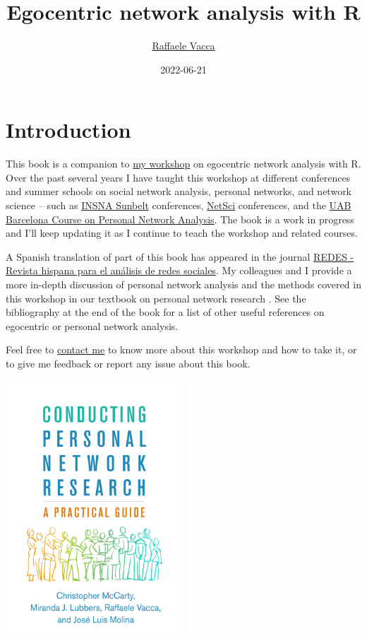 \documentclass[
]{book}
\title{Egocentric network analysis with R}
\author{\href{http://www.raffaelevacca.com/}{Raffaele Vacca}}
\date{2022-06-21}
\begin{document}
\maketitle

{
\setcounter{tocdepth}{1}
\tableofcontents
}
\hypertarget{introduction}{%
\chapter{Introduction}\label{introduction}}

This book is a companion to \href{http://www.raffaelevacca.com/teaching/egocentric-r/}{my workshop} on egocentric network analysis with R. Over the past several years I have taught this workshop at different conferences and summer schools on social network analysis, personal networks, and network science -- such as \href{https://www.insna.org/}{INSNA Sunbelt} conferences, \href{https://netscisociety.net/home}{NetSci} conferences, and the \href{https://sway.office.com/1TpXMhGqKa7fTsAC}{UAB Barcelona Course on Personal Network Analysis}. The book is a work in progress and I'll keep updating it as I continue to teach the workshop and related courses.

A Spanish translation of part of this book has appeared in the journal \href{https://revistes.uab.cat/redes/article/view/v31-n2-vacca}{REDES - Revista hispana para el análisis de redes sociales}. My colleagues and I provide a more in-depth discussion of personal network analysis and the methods covered in this workshop in our textbook on personal network research \citep{mccarty_conducting_2019}. See the bibliography at the end of the book for a list of other useful references on egocentric or personal network analysis.

Feel free to \href{http://www.raffaelevacca.com/}{contact me} to know more about this workshop and how to take it, or to give me feedback or report any issue about this book.

\href{https://www.guilford.com/books/Conducting-Personal-Network-Research/McCarty-Lubbers-Vacca-Molina/9781462538386/authors}{\includegraphics[width=0.5\textwidth,height=\textheight]{./Figures/McCarty_et_al_2019_cover.jpg}}
\end{document}
